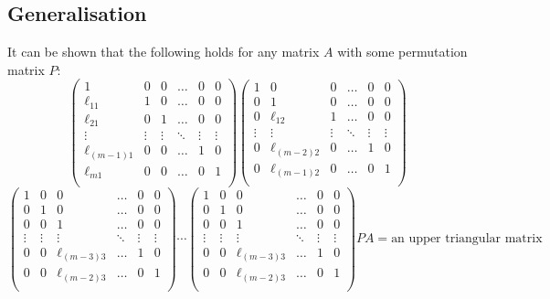 \documentclass{article}
\theoremstyle{definition}
\begin{document}
\subsection{Generalisation}
It can be shown that the following holds for any matrix $A$ with some permutation matrix $P$:
\begin{equation*}
	\left(
		\begin{matrix}
			1 & 0 & 0 & \dots & 0 & 0 \\
			\ell_{11} & 1 & 0 & \dots & 0 & 0 \\
			\ell_{21} & 0 & 1 & \dots & 0 & 0 \\
			\vdots & \vdots & \vdots & \ddots & \vdots & \vdots \\
			\ell_{(m-1)1} & 0 & 0 & \dots & 1 & 0 \\
			\ell_{m1} & 0 & 0 & \dots & 0 & 1 \\
		\end{matrix}
	\right)
	\left(
		\begin{matrix}
			1 & 0 & 0 & \dots & 0 & 0 \\
			0 & 1 & 0 & \dots & 0 & 0 \\
			0 & \ell_{12} & 1 & \dots & 0 & 0 \\
			\vdots & \vdots & \vdots & \ddots & \vdots & \vdots \\
			0 & \ell_{(m-2)2} & 0 & \dots & 1 & 0 \\
			0 & \ell_{(m-1)2} & 0 & \dots & 0 & 1 \\
		\end{matrix}
	\right)
\end{equation*}
\begin{equation*}
	\left(
		\begin{matrix}
			1 & 0 & 0 & \dots & 0 & 0 \\
			0 & 1 & 0 & \dots & 0 & 0 \\
			0 & 0 & 1 & \dots & 0 & 0 \\
			\vdots & \vdots & \vdots & \ddots & \vdots & \vdots \\
			0 & 0 & \ell_{(m-3)3} & \dots & 1 & 0 \\
			0 & 0 & \ell_{(m-2)3} & \dots & 0 & 1 \\
		\end{matrix}
	\right) \cdots
	\left(
		\begin{matrix}
			1 & 0 & 0 & \dots & 0 & 0 \\
			0 & 1 & 0 & \dots & 0 & 0 \\
			0 & 0 & 1 & \dots & 0 & 0 \\
			\vdots & \vdots & \vdots & \ddots & \vdots & \vdots \\
			0 & 0 & \ell_{(m-3)3} & \dots & 1 & 0 \\
			0 & 0 & \ell_{(m-2)3} & \dots & 0 & 1 \\
		\end{matrix}
	\right)PA=\text{an upper triangular matrix}
\end{equation*}
\end{document}
